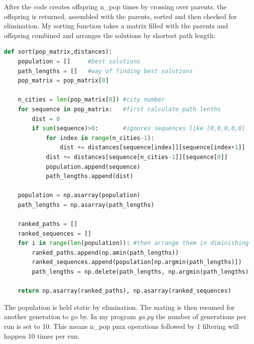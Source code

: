 \documentclass[10pt, a4paper]{article}
\begin{document}
After the code creates offspring n\_pop times by crossing over parents, the offspring is returned, assembled with the parents, sorted and then checked for elimination. 
My sorting function takes a matrix filled with the parents and offspring combined and arranges the solutions by shortest path length:
\begin{lstlisting}[language = Python]
 def sort(pop_matrix,distances): 
    population = []     #best solutions
    path_lengths = []   #way of finding best solutions
    pop_matrix = pop_matrix[0] 

    n_cities = len(pop_matrix[0]) #city number
    for sequence in pop_matrix:   #first calculate path lenths
        dist = 0
        if sum(sequence)>0:       #ignores sequences like [0,0,0,0,0]
            for index in range(n_cities-1):
                dist += distances[sequence[index]][sequence[index+1]]
            dist += distances[sequence[n_cities-1]][sequence[0]]
            population.append(sequence)
            path_lengths.append(dist)

    population = np.asarray(population)
    path_lengths = np.asarray(path_lengths)

    ranked_paths = []
    ranked_sequences = []
    for i in range(len(population)): #then arrange them in diminishing order
        ranked_paths.append(np.amin(path_lengths))
        ranked_sequences.append(population[np.argmin(path_lengths)])
        path_lengths = np.delete(path_lengths, np.argmin(path_lengths)) 
        
    return np.asarray(ranked_paths), np.asarray(ranked_sequences) 
\end{lstlisting}



The population is held static by elimination. The mating is then resumed for another generation to go by. In my program \emph{ga.py} the number of generations per run is set to 10.
This means n\_pop pmx operations followed by 1 filtering will happen 10 times per run.
\end{document}

